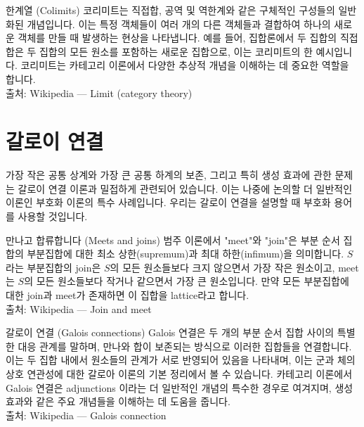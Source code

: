 \documentclass[11pt, a4paper, twoside, openany]{book}
\begin{document}
\begin{deepresearch}{한계열 (Colimits)}
코리미트는 직접합, 공역 및 역한계와 같은 구체적인 구성들의 일반화된 개념입니다.  이는 특정 객체들이 여러 개의 다른 객체들과 결합하여 하나의 새로운 객체를 만들 때 발생하는 현상을 나타냅니다. 예를 들어, 집합론에서 두 집합의 직접 합은 두 집합의 모든 원소를 포함하는 새로운 집합으로, 이는 코리미트의 한 예시입니다.  코리미트는 카테고리 이론에서 다양한 추상적 개념을 이해하는 데 중요한 역할을 합니다.
\\[4pt]{\footnotesize\color{ctgray} 출처: Wikipedia — Limit (category theory)}
\end{deepresearch}


\section{갈로이 연결}
\label{sec:1-4}

가장 작은 공통 상계와 가장 큰 공통 하계의 보존, 그리고 특히 생성 효과에 관한 문제는 갈로이 연결 이론과 밀접하게 관련되어 있습니다. 이는 나중에 논의할 더 일반적인 이론인 부호화 이론의 특수 사례입니다. 우리는 갈로이 연결을 설명할 때 부호화 용어를 사용할 것입니다.

\begin{deepresearch}{만나고 합류합니다 (Meets and joins)}
범주 이론에서 "meet"와 "join"은 부분 순서 집합의 부분집합에 대한 최소 상한(supremum)과 최대 하한(infimum)을 의미합니다.  $S$라는 부분집합의 join\hspace{0pt}은 $S$의 모든 원소들보다 크지 않으면서 가장 작은 원소이고, meet\hspace{0pt}는 $S$의 모든 원소들보다 작거나 같으면서 가장 큰 원소입니다. 만약 모든 부분집합에 대한 join\hspace{0pt}과 meet\hspace{0pt}가 존재하면 이 집합을 lattice\hspace{0pt}라고 합니다.
\\[4pt]{\footnotesize\color{ctgray} 출처: Wikipedia — Join and meet}
\end{deepresearch}

\begin{deepresearch}{갈로이 연결 (Galois connections)}
Galois 연결은 두 개의 부분 순서 집합 사이의 특별한 대응 관계를 말하며, 만나와 합이 보존되는 방식으로 이러한 집합들을 연결합니다.  이는 두 집합 내에서 원소들의 관계가 서로 반영되어 있음을 나타내며, 이는 군과 체의 상호 연관성에 대한 갈로아 이론의 기본 정리에서 볼 수 있습니다. 카테고리 이론에서 Galois 연결은 adjunctions 이라는 더 일반적인 개념의 특수한 경우로 여겨지며, 생성 효과와 같은 주요 개념들을 이해하는 데 도움을 줍니다.
\\[4pt]{\footnotesize\color{ctgray} 출처: Wikipedia — Galois connection}
\end{deepresearch}
\end{document}
